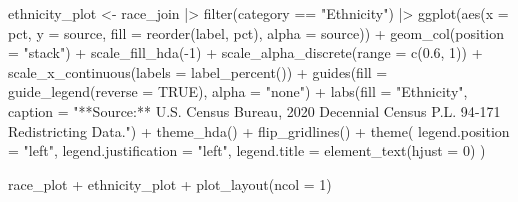 \documentclass[
  letterpaper,
  DIV=11,
  numbers=noendperiod]{scrartcl}
\newenvironment{Shaded}{\begin{snugshade}}{\end{snugshade}}
\newcommand{\AttributeTok}[1]{\textcolor[rgb]{0.40,0.45,0.13}{#1}}
\newcommand{\ConstantTok}[1]{\textcolor[rgb]{0.56,0.35,0.01}{#1}}
\newcommand{\DecValTok}[1]{\textcolor[rgb]{0.68,0.00,0.00}{#1}}
\newcommand{\FloatTok}[1]{\textcolor[rgb]{0.68,0.00,0.00}{#1}}
\newcommand{\FunctionTok}[1]{\textcolor[rgb]{0.28,0.35,0.67}{#1}}
\newcommand{\NormalTok}[1]{\textcolor[rgb]{0.00,0.23,0.31}{#1}}
\newcommand{\OtherTok}[1]{\textcolor[rgb]{0.00,0.23,0.31}{#1}}
\newcommand{\SpecialCharTok}[1]{\textcolor[rgb]{0.37,0.37,0.37}{#1}}
\newcommand{\StringTok}[1]{\textcolor[rgb]{0.13,0.47,0.30}{#1}}
\begin{document}
\begin{Shaded}
\begin{Highlighting}[]
\NormalTok{ethnicity\_plot }\OtherTok{\textless{}{-}}\NormalTok{ race\_join }\SpecialCharTok{|\textgreater{}} 
  \FunctionTok{filter}\NormalTok{(category }\SpecialCharTok{==} \StringTok{"Ethnicity"}\NormalTok{) }\SpecialCharTok{|\textgreater{}} 
  \FunctionTok{ggplot}\NormalTok{(}\FunctionTok{aes}\NormalTok{(}\AttributeTok{x =}\NormalTok{ pct, }\AttributeTok{y =}\NormalTok{ source, }\AttributeTok{fill =} \FunctionTok{reorder}\NormalTok{(label, pct), }\AttributeTok{alpha =}\NormalTok{ source)) }\SpecialCharTok{+}
    \FunctionTok{geom\_col}\NormalTok{(}\AttributeTok{position =} \StringTok{"stack"}\NormalTok{) }\SpecialCharTok{+}
    \FunctionTok{scale\_fill\_hda}\NormalTok{(}\SpecialCharTok{{-}}\DecValTok{1}\NormalTok{) }\SpecialCharTok{+}
    \FunctionTok{scale\_alpha\_discrete}\NormalTok{(}\AttributeTok{range =} \FunctionTok{c}\NormalTok{(}\FloatTok{0.6}\NormalTok{, }\DecValTok{1}\NormalTok{)) }\SpecialCharTok{+}
    \FunctionTok{scale\_x\_continuous}\NormalTok{(}\AttributeTok{labels =} \FunctionTok{label\_percent}\NormalTok{()) }\SpecialCharTok{+}
    \FunctionTok{guides}\NormalTok{(}\AttributeTok{fill =} \FunctionTok{guide\_legend}\NormalTok{(}\AttributeTok{reverse =} \ConstantTok{TRUE}\NormalTok{),}
           \AttributeTok{alpha =} \StringTok{"none"}\NormalTok{) }\SpecialCharTok{+}
    \FunctionTok{labs}\NormalTok{(}\AttributeTok{fill =} \StringTok{"Ethnicity"}\NormalTok{,}
         \AttributeTok{caption =} \StringTok{"**Source:** U.S. Census Bureau, 2020 Decennial Census P.L. 94{-}171 Redistricting Data."}\NormalTok{) }\SpecialCharTok{+}
    \FunctionTok{theme\_hda}\NormalTok{() }\SpecialCharTok{+}
    \FunctionTok{flip\_gridlines}\NormalTok{() }\SpecialCharTok{+}
    \FunctionTok{theme}\NormalTok{(}
      \AttributeTok{legend.position =} \StringTok{"left"}\NormalTok{,}
      \AttributeTok{legend.justification =} \StringTok{"left"}\NormalTok{,}
      \AttributeTok{legend.title =} \FunctionTok{element\_text}\NormalTok{(}\AttributeTok{hjust =} \DecValTok{0}\NormalTok{)}
\NormalTok{    )}

\NormalTok{race\_plot }\SpecialCharTok{+}\NormalTok{ ethnicity\_plot }\SpecialCharTok{+}
  \FunctionTok{plot\_layout}\NormalTok{(}\AttributeTok{ncol =} \DecValTok{1}\NormalTok{)}
\end{Highlighting}
\end{Shaded}
\end{document}
